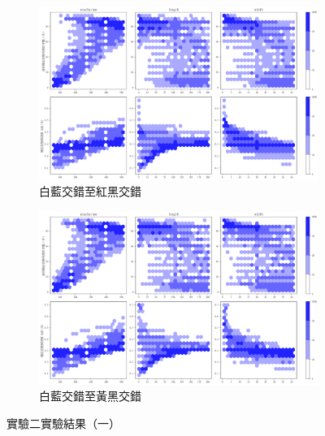 \documentclass[12pt]{article}
\begin{document}
\begin{figure}[htbp]
  \centering
  \begin{subfigure}[b]{0.9\textwidth}
    \centering
    \includegraphics[width=\textwidth]{img/OutputImg/_Blank_BR.png}
    \caption{白藍交錯至紅黑交錯}
  \end{subfigure}

  \begin{subfigure}[b]{0.9\textwidth}
    \centering
    \includegraphics[width=\textwidth]{img/OutputImg/_Blank_BY.png}
    \caption{白藍交錯至黃黑交錯}
  \end{subfigure}

  \caption{實驗二實驗結果（一）}\label{fig:result_2}

\end{figure}
\end{document}
